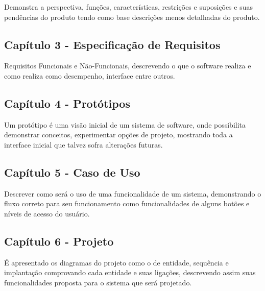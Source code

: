 Demonstra a perspectiva, funções, características, restrições e suposições e suas pendências do produto tendo como base descrições menos detalhadas do produto.

\subsection{Capítulo 3 - Especificação de Requisitos}

Requisitos Funcionais e Não-Funcionais, descrevendo o que o software realiza e como realiza como desempenho, interface entre outros.

\subsection{Capítulo 4 - Protótipos}

Um protótipo é uma visão inicial de um sistema de software, onde possibilita demonstrar conceitos, experimentar opções de projeto, mostrando toda a interface inicial que talvez sofra alterações futuras.

\subsection{Capítulo 5 - Caso de Uso}

Descrever como será o uso de uma funcionalidade de um sistema, demonstrando o fluxo correto para seu funcionamento como funcionalidades de alguns botões e níveis de acesso do usuário.

\subsection{Capítulo 6 - Projeto}

É apresentado os diagramas do projeto como o de entidade, sequência e implantação comprovando cada entidade e suas ligações, descrevendo assim suas funcionalidades proposta para o sistema que será projetado.